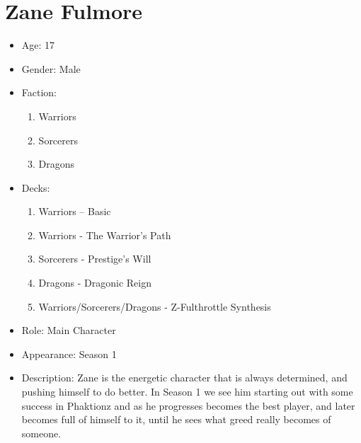 \section{Zane Fulmore}
\begin{itemize}
	\item Age: 17
	\item Gender: Male
	\item Faction:
	      \begin{enumerate}
		      \item Warriors
		      \item Sorcerers
		      \item Dragons
	      \end{enumerate}
	\item Decks:
	      \begin{enumerate}
		      \item Warriors – Basic
		      \item Warriors - The Warrior’s Path
		      \item Sorcerers - Prestige’s Will
		      \item Dragons - Dragonic Reign
		      \item Warriors/Sorcerers/Dragons - Z-Fulthrottle Synthesis
	      \end{enumerate}
	\item Role: Main Character
	\item Appearance: Season 1
	\item Description: Zane is the energetic character that is always determined,
	      and pushing himself to do better. In Season 1 we see him starting out with some
	      success in Phaktionz and as he progresses becomes the best player, and later
	      becomes full of himself to it, until he sees what greed really becomes of someone.
\end{itemize}
\newpage